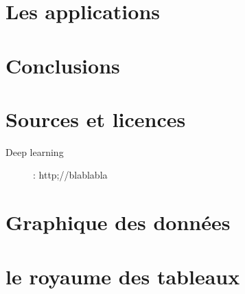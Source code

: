 \documentclass{report}
\begin{document}
\chapter{Les applications}

\chapter*{Conclusions}

\chapter*{Sources et licences}

\begin{description}
 \item [Deep learning]: http;//blablabla
 
\end{description}  

\appendix

\chapter{Graphique des données}

\chapter{le royaume des tableaux}
\end{document}
